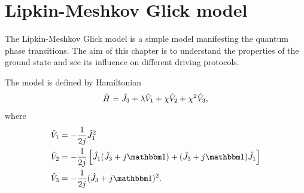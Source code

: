 \chapter{Lipkin-Meshkov Glick model}
The Lipkin-Meshkov Glick model is a simple model manifesting the quantum phase transitions. The aim of this chapter is to understand the properties of the ground state and see its influence on different driving protocols.


The model is defined by Hamiltonian
\begin{equation}
    \hat{H}=\hat{J}_3+\lambda\hat V_1 +\chi \hat V_2+\chi^2 \hat V_3,
    \label{eq:firstOrderTransitionHamiltonian}
\end{equation}
where
\begin{align}
    \hat V_1 &=-\frac{1}{2j}\J_1^2\\
    \hat V_2 &= -\frac{1}{2j}\left[\J_1(\J_3+j\Id)+(\J_3+j\Id)\J_1\right]\\
    \hat V_3 &= -\frac{1}{2j}(\J_3+j\Id)^2.
\end{align}



